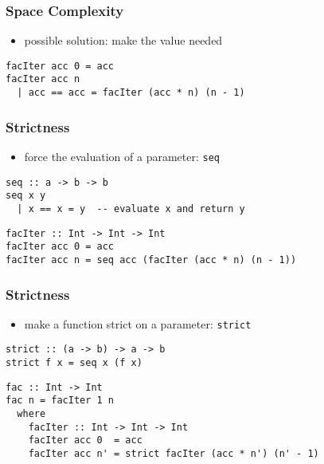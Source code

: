 \documentclass[dvipsnames]{beamer}
\theoremstyle{plain}
\begin{document}
\begin{frame}[fragile]
  \frametitle{Space Complexity}

  \begin{itemize}
    \item possible solution: make the value needed
  \end{itemize}

  \begin{exampleblock}{}
    \begin{lstlisting}
facIter acc 0 = acc
facIter acc n
  | acc == acc = facIter (acc * n) (n - 1)
    \end{lstlisting}
  \end{exampleblock}
\end{frame}

\begin{frame}[fragile]
  \frametitle{Strictness}

  \begin{itemize}
    \item force the evaluation of a parameter:
      \lstinline|seq|
  \end{itemize}

  \begin{exampleblock}{}
    \begin{lstlisting}
seq :: a -> b -> b
seq x y
  | x == x = y  -- evaluate x and return y
    \end{lstlisting}

    \pause
    \medskip
    \begin{lstlisting}
facIter :: Int -> Int -> Int
facIter acc 0 = acc
facIter acc n = seq acc (facIter (acc * n) (n - 1))
    \end{lstlisting}
  \end{exampleblock}
\end{frame}

\begin{frame}[fragile]
  \frametitle{Strictness}

  \begin{itemize}
    \item make a function strict on a parameter:
      \lstinline|strict|
  \end{itemize}

  \begin{exampleblock}{}
    \begin{lstlisting}
strict :: (a -> b) -> a -> b
strict f x = seq x (f x)
    \end{lstlisting}

    \pause
    \medskip
    \begin{lstlisting}
fac :: Int -> Int
fac n = facIter 1 n
  where
    facIter :: Int -> Int -> Int
    facIter acc 0  = acc
    facIter acc n' = strict facIter (acc * n') (n' - 1)
    \end{lstlisting}
  \end{exampleblock}
\end{frame}
\end{document}
